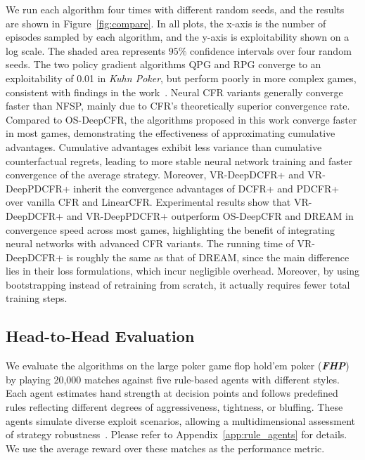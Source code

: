 \documentclass[letterpaper]{article} %
\newcommand{\red}[1]{\textcolor{red}{#1}}
\begin{document}
We run each algorithm four times with different random seeds, and the results are shown in Figure~\ref{fig:compare}. 
In all plots, the x-axis is the number of episodes sampled by each algorithm, and the y-axis is exploitability shown on a log scale. The shaded area represents $95\%$ confidence intervals over four random seeds.
The two policy gradient algorithms QPG and RPG converge to an exploitability of 0.01 in \textit{Kuhn Poker}, but perform poorly in more complex games, consistent with findings in the work~\citep{farina2021model}.
Neural CFR variants generally converge faster than NFSP, mainly due to CFR's theoretically superior convergence rate. 
Compared to OS-DeepCFR, the algorithms proposed in this work converge faster in most games, demonstrating the effectiveness of approximating cumulative advantages.
Cumulative advantages exhibit less variance than cumulative counterfactual regrets, leading to more stable neural network training and faster convergence of the average strategy.
Moreover, VR-DeepDCFR+ and VR-DeepPDCFR+ inherit the convergence advantages of DCFR+ and PDCFR+ over vanilla CFR and LinearCFR.
Experimental results show that VR-DeepDCFR+ and VR-DeepPDCFR+ outperform OS-DeepCFR and DREAM in convergence speed across most games, highlighting the benefit of integrating neural networks with advanced CFR variants.
The running time of VR-DeepDCFR+ is roughly the same as that of DREAM, since the main difference lies in their loss formulations, which incur negligible overhead. 
Moreover, by using bootstrapping instead of retraining from scratch, it actually requires fewer total training steps.

\subsection{Head-to-Head Evaluation}

We evaluate the algorithms on the large poker game flop hold'em poker (\textbf{\textit{FHP}}) by playing 20,000 matches against five rule-based agents with different styles.
Each agent estimates hand strength at decision points and follows predefined rules reflecting different degrees of aggressiveness, tightness, or bluffing.
These agents simulate diverse exploit scenarios, allowing a multidimensional assessment of strategy robustness~\citep{li2018opponent}. Please refer to Appendix~\ref{app:rule_agents} for details.
We use the average reward over these matches as the performance metric.
\end{document}
